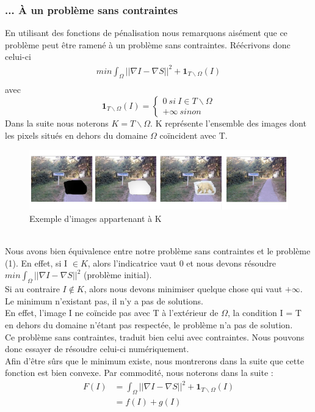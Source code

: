 \subsubsection{... À un problème sans contraintes}
En utilisant des fonctions de pénalisation nous remarquons aisément que ce problème peut être ramené à un problème sans contraintes. Réécrivons donc celui-ci 
\begin{equation*}
\begin{aligned}{}
    min \int_\Omega ||\nabla I - \nabla S||^2 + \mathbf{1} _{T \backslash \Omega } (I) \\
    \end{aligned}
\end{equation*}{}
avec 
\begin{equation*}
\mathbf{1}_{ T \backslash \Omega }(I) =
	\left\{
	\begin{aligned}{}
	0 \ si\  I \in T \backslash \Omega \\
	+ \infty \ sinon
    \end{aligned}
    \right.
\end{equation*}{}
Dans la suite nous noterons $K = T\backslash \Omega$. K représente l'ensemble des images dont les pixels situés en dehors du domaine $\Omega$ coïncident avec T.\\
\begin{figure}[!h]
\centering
\includegraphics[scale=0.5]{Images/K.png}
\caption{Exemple d'images appartenant à K}
\end{figure}
\\
Nous avons bien équivalence entre notre problème sans contraintes et le problème (1). En effet, si I $\in K$, alors l'indicatrice vaut 0 et nous devons résoudre $min \int_\Omega ||\nabla I - \nabla S||^2 $ (problème initial). \\
Si au contraire $I \notin K$, alors nous devons minimiser quelque chose qui vaut $+\infty$. Le minimum n'existant pas, il n'y a pas de solutions.\\
En effet, l'image I ne coïncide pas avec T à l'extérieur de $\Omega$,  la condition I = T en dehors du domaine n'étant pas respectée, le problème n'a pas de solution. \\
 Ce problème sans contraintes, traduit bien celui avec contraintes. Nous pouvons donc essayer de résoudre celui-ci numériquement.\\ Afin d'être sûrs que le minimum existe, nous montrerons dans la suite que cette fonction est bien convexe. 
 Par commodité, nous noterons dans la suite : 
 \begin{equation*}
 \begin{aligned}
 F(I) &=   \int_\Omega ||\nabla I - \nabla S||^2 + \mathbf{1} _{T\backslash \Omega } (I) \\
 & = f(I)+ g(I)
 \end{aligned}
 \end{equation*}
